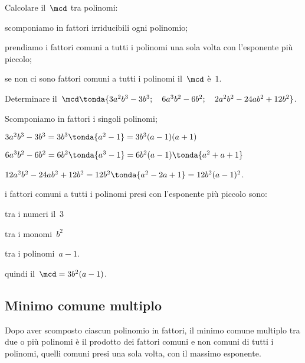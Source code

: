 \begin{procedura}
Calcolare il~\(\mcd\) tra polinomi:
\begin{enumeratea}
\item scomponiamo in fattori irriducibili ogni polinomio;
\item prendiamo i fattori comuni a tutti i polinomi una sola volta con 
l'esponente più piccolo;
\item se non ci sono fattori comuni a tutti i polinomi il~\(\mcd\) è~\(1\).
\end{enumeratea}
\end{procedura}

 \begin{esempio}
Determinare il~\(\mcd \tonda{3a^{2}b^{3}-3b^{3};\quad 6a^{3}b^{2}-6b^{2}; 
                      \quad 2a^{2}b^{2}-24ab^{2}+12b^{2}} \).
 \begin{itemize*}
 \item Scomponiamo in fattori i singoli polinomi;
  \begin{itemize*}
  \item \(3a^{2}b^{3}-3b^{3}=3b^{3} \tonda{a^{2}-1} =3b^{3}(a-1)(a+1)\)
  \item \(6a^{3}b^{2}-6b^{2}=6b^{2} \tonda{a^{3}-1} =
         6b^{2}(a-1) \tonda{a^{2}+a+1} \)
  \item \(12a^{2}b^{2}-24ab^{2}+12b^{2}=12b^{2} \tonda{a^{2}-2a+1} =
         12b^{2}(a-1)^{2}\).
  \end{itemize*}
 \item i fattori comuni a tutti i polinomi presi con l'esponente più piccolo 
  sono:
  \begin{itemize*}
  \item tra i numeri il~\(3\)
  \item tra i monomi~\(b^{2}\)
  \item tra i polinomi~\(a-1\).
  \end{itemize*}
 \item quindi il~\(\mcd=3b^{2}(a-1)\).
 \end{itemize*}
 \end{esempio}

\subsection{Minimo comune multiplo}
Dopo aver scomposto ciascun polinomio in fattori, il minimo comune multiplo 
tra due o più polinomi è il prodotto dei fattori comuni e non comuni di tutti 
i polinomi, quelli comuni presi una sola volta, con il massimo esponente.

